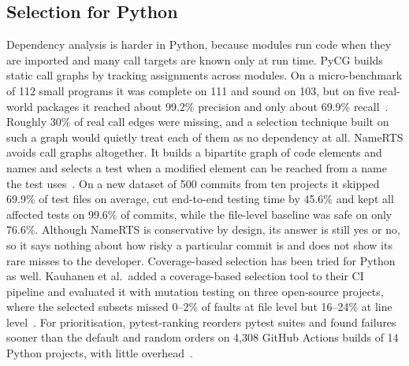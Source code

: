 \documentclass[11pt]{article}
\begin{document}
\subsection*{Selection for Python}
Dependency analysis is harder in Python, because modules run code when they are imported and many call targets are known only at run time. PyCG builds static call graphs by tracking assignments across modules. On a micro-benchmark of 112 small programs it was complete on 111 and sound on 103, but on five real-world packages it reached about 99.2\% precision and only about 69.9\% recall~\cite{salis2021pycg}. Roughly 30\% of real call edges were missing, and a selection technique built on such a graph would quietly treat each of them as no dependency at all. NameRTS avoids call graphs altogether. It builds a bipartite graph of code elements and names and selects a test when a modified element can be reached from a name the test uses~\cite{wang2026namerts}. On a new dataset of 500 commits from ten projects it skipped 69.9\% of test files on average, cut end-to-end testing time by 45.6\% and kept all affected tests on 99.6\% of commits, while the file-level baseline was safe on only 76.6\%. Although NameRTS is conservative by design, its answer is still yes or no, so it says nothing about how risky a particular commit is and does not show its rare misses to the developer. Coverage-based selection has been tried for Python as well. Kauhanen et al.\ added a coverage-based selection tool to their CI pipeline and evaluated it with mutation testing on three open-source projects, where the selected subsets missed 0--2\% of faults at file level but 16--24\% at line level~\cite{kauhanen2021python}. For prioritisation, pytest-ranking reorders pytest suites and found failures sooner than the default and random orders on 4,308 GitHub Actions builds of 14 Python projects, with little overhead~\cite{cheng2025pytestranking}.
\end{document}
